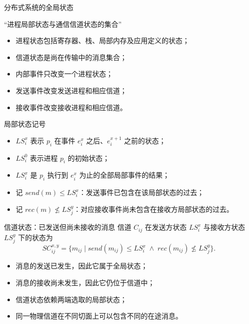 \documentclass[UTF8,fontset=none,aspectratio=169,10pt]{beamer}
\begin{document}
\begin{frame}{分布式系统的全局状态}
\begin{center}\Large\color{ADSDarkBlue}
“进程局部状态与通信信道状态的集合”
\end{center}
\vfill
\begin{itemize}
  \item 进程状态包括寄存器、栈、局部内存及应用定义的状态；
  \item 信道状态是尚在传输中的消息集合；
  \item 内部事件只改变一个进程状态；
  \item 发送事件改变发送进程和相应信道；
  \item 接收事件改变接收进程和相应信道。
\end{itemize}
\end{frame}

\begin{frame}{局部状态记号}
\begin{itemize}
  \item $LS_i^x$ 表示 $p_i$ 在事件 $e_i^x$ 之后、$e_i^{x+1}$ 之前的状态；
  \item $LS_i^0$ 表示进程 $p_i$ 的初始状态；
  \item $LS_i^x$ 是 $p_i$ 执行到 $e_i^x$ 为止的全部局部事件的结果；
  \item 记 $send(m)\le LS_i^x$：发送事件已包含在该局部状态的过去；
  \item 记 $rec(m)\not\le LS_j^y$：对应接收事件尚未包含在接收方局部状态的过去。
\end{itemize}
\vfill
\begin{center}
\end{center}
\end{frame}

\begin{frame}{信道状态：已发送但尚未接收的消息}
信道 $C_{ij}$ 在发送方状态 $LS_i^x$ 与接收方状态 $LS_j^y$ 下的状态为
\[
SC_{ij}^{x,y}=\{m_{ij}\mid
send(m_{ij})\le LS_i^x\;\land\;
rec(m_{ij})\not\le LS_j^y\}.
\]
\vfill
\begin{itemize}
  \item 消息的发送已发生，因此它属于全局状态；
  \item 消息的接收尚未发生，因此它仍位于信道中；
  \item 信道状态依赖两端选取的局部状态；
  \item 同一物理信道在不同切面上可以包含不同的在途消息。
\end{itemize}
\end{frame}
\end{document}
